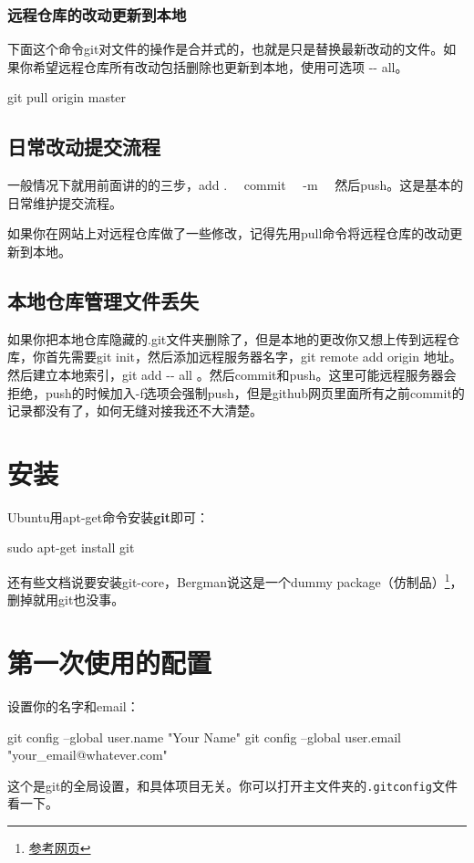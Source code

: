 \documentclass[11pt,oneside]{book}
\begin{document}
\subsubsection{远程仓库的改动更新到本地}
下面这个命令git对文件的操作是合并式的，也就是只是替换最新改动的文件。如果你希望远程仓库所有改动包括删除也更新到本地，使用可选项 -{}- all。
\begin{tcbbash}[]
git  pull origin master
\end{tcbbash}


\subsection{日常改动提交流程}
一般情况下就用前面讲的的三步，add .~~ commit ~~-m~~ 然后push。这是基本的日常维护提交流程。

如果你在网站上对远程仓库做了一些修改，记得先用pull命令将远程仓库的改动更新到本地。

\subsection{本地仓库管理文件丢失}
如果你把本地仓库隐藏的.git文件夹删除了，但是本地的更改你又想上传到远程仓库，你首先需要git init，然后添加远程服务器名字，git remote add origin 地址。然后建立本地索引，git add -{}- all  。然后commit和push。这里可能远程服务器会拒绝，push的时候加入-f选项会强制push，但是github网页里面所有之前commit的记录都没有了，如何无缝对接我还不大清楚。


\section{安装}
Ubuntu用apt-get命令安装\textbf{git}即可：
\begin{tcbbash}[]
sudo apt-get install git
\end{tcbbash}
还有些文档说要安装git-core，Bergman说这是一个dummy package（仿制品）\footnote{\href{http://askubuntu.com/questions/5930/what-are-the-differences-between-the-git-and-git-core-packages}{参考网页}}，删掉就用git也没事。

\section{第一次使用的配置}
设置你的名字和email：
\begin{tcbbash}[]
git config --global user.name "Your Name"
git config --global user.email "your_email@whatever.com"
\end{tcbbash}
这个是git的全局设置，和具体项目无关。你可以打开主文件夹的\verb+.gitconfig+文件看一下。
\end{document}
